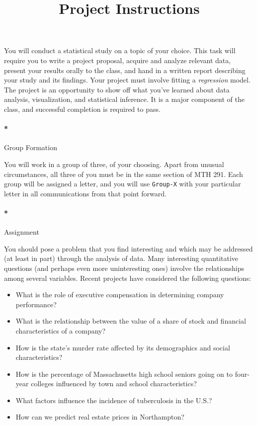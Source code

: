 \documentclass[]{article}
\title{Project Instructions}
\author{}
\date{}
\let\oldparagraph\paragraph
\renewcommand{\paragraph}[1]{\oldparagraph{#1}\mbox{}}
\begin{document}
\maketitle

You will conduct a statistical study on a topic of your choice. This
task will require you to write a project proposal, acquire and analyze
relevant data, present your results orally to the class, and hand in a
written report describing your study and its findings. Your project must
involve fitting a \emph{regression} model. The project is an opportunity
to show off what you've learned about data analysis, visualization, and
statistical inference. It is a major component of the class, and
successful completion is required to pass.

\paragraph*{Group Formation}\label{group-formation}

You will work in a group of three, of your choosing. Apart from unusual
circumstances, all three of you must be in the same section of MTH 291.
Each group will be assigned a letter, and you will use \texttt{Group-X}
with your particular letter in all communications from that point
forward.

\paragraph*{Assignment}\label{assignment}

You should pose a problem that you find interesting and which may be
addressed (at least in part) through the analysis of data. Many
interesting quantitative questions (and perhaps even more uninteresting
ones) involve the relationships among several variables. Recent projects
have considered the following questions:

\begin{itemize}
\item
  What is the role of executive compensation in determining company
  performance?
\item
  What is the relationship between the value of a share of stock and
  financial characteristics of a company?
\item
  How is the state's murder rate affected by its demographics and social
  characteristics?
\item
  How is the percentage of Massachusetts high school seniors going on to
  four-year colleges influenced by town and school characteristics?
\item
  What factors influence the incidence of tuberculosis in the U.S.?
\item
  How can we predict real estate prices in Northampton?
\end{itemize}
\end{document}
